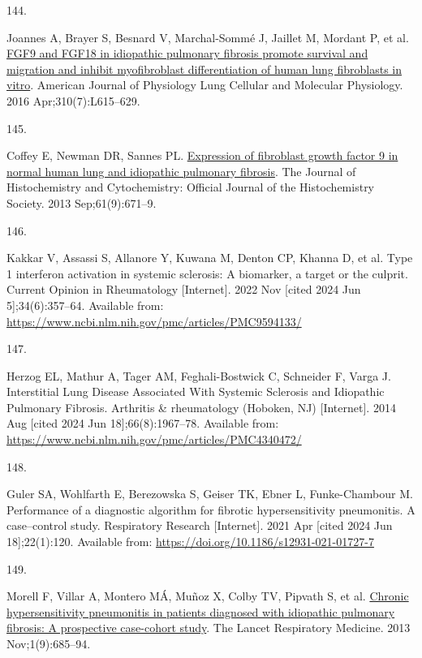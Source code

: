 \documentclass[
]{article}
\newlength{\cslhangindent}
\newlength{\csllabelwidth}
\newenvironment{CSLReferences}[2] %
 {\begin{list}{}{%
  \setlength{\itemindent}{0pt}
  \setlength{\leftmargin}{0pt}
  \setlength{\parsep}{0pt}
  \ifodd #1
   \setlength{\leftmargin}{\cslhangindent}
   \setlength{\itemindent}{-1\cslhangindent}
  \fi
  \setlength{\itemsep}{#2\baselineskip}}}
 {\end{list}}
\newcommand{\CSLLeftMargin}[1]{\parbox[t]{\csllabelwidth}{\strut#1\strut}}
\newcommand{\CSLRightInline}[1]{\parbox[t]{\linewidth - \csllabelwidth}{\strut#1\strut}}
\begin{document}
\begin{CSLReferences}{0}{1}
\CSLLeftMargin{144. }%
\CSLRightInline{Joannes A, Brayer S, Besnard V, Marchal-Sommé J, Jaillet M, Mordant P, et al. \href{https://doi.org/10.1152/ajplung.00185.2015}{{FGF9} and {FGF18} in idiopathic pulmonary fibrosis promote survival and migration and inhibit myofibroblast differentiation of human lung fibroblasts in vitro}. American Journal of Physiology Lung Cellular and Molecular Physiology. 2016 Apr;310(7):L615--629. }

\CSLLeftMargin{145. }%
\CSLRightInline{Coffey E, Newman DR, Sannes PL. \href{https://doi.org/10.1369/0022155413497366}{Expression of fibroblast growth factor 9 in normal human lung and idiopathic pulmonary fibrosis}. The Journal of Histochemistry and Cytochemistry: Official Journal of the Histochemistry Society. 2013 Sep;61(9):671--9. }

\CSLLeftMargin{146. }%
\CSLRightInline{Kakkar V, Assassi S, Allanore Y, Kuwana M, Denton CP, Khanna D, et al. Type 1 interferon activation in systemic sclerosis: A biomarker, a target or the culprit. Current Opinion in Rheumatology {[}Internet{]}. 2022 Nov {[}cited 2024 Jun 5{]};34(6):357--64. Available from: \url{https://www.ncbi.nlm.nih.gov/pmc/articles/PMC9594133/}}

\CSLLeftMargin{147. }%
\CSLRightInline{Herzog EL, Mathur A, Tager AM, Feghali-Bostwick C, Schneider F, Varga J. Interstitial {Lung} {Disease} {Associated} {With} {Systemic} {Sclerosis} and {Idiopathic} {Pulmonary} {Fibrosis}. Arthritis \& rheumatology (Hoboken, NJ) {[}Internet{]}. 2014 Aug {[}cited 2024 Jun 18{]};66(8):1967--78. Available from: \url{https://www.ncbi.nlm.nih.gov/pmc/articles/PMC4340472/}}

\CSLLeftMargin{148. }%
\CSLRightInline{Guler SA, Wohlfarth E, Berezowska S, Geiser TK, Ebner L, Funke-Chambour M. Performance of a diagnostic algorithm for fibrotic hypersensitivity pneumonitis. {A} case--control study. Respiratory Research {[}Internet{]}. 2021 Apr {[}cited 2024 Jun 18{]};22(1):120. Available from: \url{https://doi.org/10.1186/s12931-021-01727-7}}

\CSLLeftMargin{149. }%
\CSLRightInline{Morell F, Villar A, Montero MÁ, Muñoz X, Colby TV, Pipvath S, et al. \href{https://doi.org/10.1016/S2213-2600(13)70191-7}{Chronic hypersensitivity pneumonitis in patients diagnosed with idiopathic pulmonary fibrosis: A prospective case-cohort study}. The Lancet Respiratory Medicine. 2013 Nov;1(9):685--94. }


\end{CSLReferences}
\end{document}
